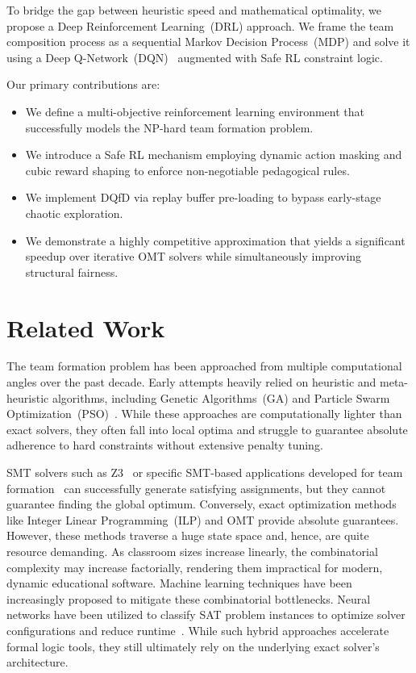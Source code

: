 \documentclass{icai2026} %
\begin{document}
To bridge the gap between heuristic speed and mathematical optimality, we propose a Deep Reinforcement Learning~(DRL) approach. We frame the team composition process as a sequential Markov Decision Process~(MDP) and solve it using a Deep Q-Network~(DQN)~\cite{Mnih2015} augmented with Safe RL constraint logic.

Our primary contributions are:
\begin{itemize}
    \item We define a multi-objective reinforcement learning environment that successfully models the NP-hard team formation problem.
    \item We introduce a Safe RL mechanism employing dynamic action masking and cubic reward shaping to enforce non-negotiable pedagogical rules.
    \item We implement DQfD via replay buffer pre-loading to bypass early-stage chaotic exploration.
    \item We demonstrate a highly competitive approximation that yields a significant speedup over iterative OMT solvers while simultaneously improving structural fairness.
\end{itemize}

\section{Related Work}\label{section:related}

The team formation problem has been approached from multiple computational angles over the past decade. Early attempts heavily relied on heuristic and meta-heuristic algorithms, including Genetic Algorithms~(GA) and Particle Swarm Optimization~(PSO)~\cite{Alberola2016}. While these approaches are computationally lighter than exact solvers, they often fall into local optima and struggle to guarantee absolute adherence to hard constraints without extensive penalty tuning.

SMT solvers such as Z3~\cite{DeMoura2008} or specific SMT-based applications developed for team formation~\cite{SMT} can successfully generate satisfying assignments, but they cannot guarantee finding the global optimum.
Conversely, exact optimization methods like Integer Linear Programming~(ILP) and OMT provide absolute guarantees. 
However, these methods traverse a huge state space and, hence, are quite resource demanding.
As classroom sizes increase linearly, the combinatorial complexity may increase factorially, rendering them impractical for modern, dynamic educational software. Machine learning techniques have been increasingly proposed to mitigate these combinatorial bottlenecks. Neural networks have been utilized to classify SAT problem instances to optimize solver configurations and reduce runtime~\cite{Danisovszky2020}. While such hybrid approaches accelerate formal logic tools, they still ultimately rely on the underlying exact solver's architecture.
\end{document}
